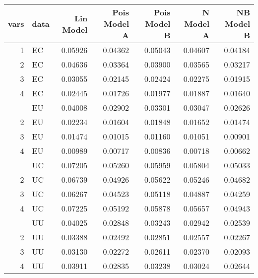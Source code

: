 
\begin{tabular}[t]{rlrrrrr}
\toprule
vars & data & Lin Model & Pois Model A & Pois Model B & N Model A & NB Model B\\
\midrule
1 & EC & 0.05926 & 0.04362 & 0.05043 & 0.04607 & 0.04184\\
2 & EC & 0.04636 & 0.03364 & 0.03900 & 0.03565 & 0.03217\\
3 & EC & 0.03055 & 0.02145 & 0.02424 & 0.02275 & 0.01915\\
4 & EC & 0.02445 & 0.01726 & 0.01977 & 0.01887 & 0.01640\\
\addlinespace
1 & EU & 0.04008 & 0.02902 & 0.03301 & 0.03047 & 0.02626\\
2 & EU & 0.02234 & 0.01604 & 0.01848 & 0.01652 & 0.01474\\
3 & EU & 0.01474 & 0.01015 & 0.01160 & 0.01051 & 0.00901\\
4 & EU & 0.00989 & 0.00717 & 0.00836 & 0.00718 & 0.00662\\
\addlinespace
1 & UC & 0.07205 & 0.05260 & 0.05959 & 0.05804 & 0.05033\\
2 & UC & 0.06739 & 0.04926 & 0.05622 & 0.05246 & 0.04682\\
3 & UC & 0.06267 & 0.04523 & 0.05118 & 0.04887 & 0.04259\\
4 & UC & 0.07225 & 0.05192 & 0.05878 & 0.05657 & 0.04943\\
\addlinespace
1 & UU & 0.04025 & 0.02848 & 0.03243 & 0.02942 & 0.02539\\
2 & UU & 0.03388 & 0.02492 & 0.02851 & 0.02557 & 0.02267\\
3 & UU & 0.03130 & 0.02272 & 0.02611 & 0.02370 & 0.02093\\
4 & UU & 0.03911 & 0.02835 & 0.03238 & 0.03024 & 0.02644\\
\bottomrule
\end{tabular}
